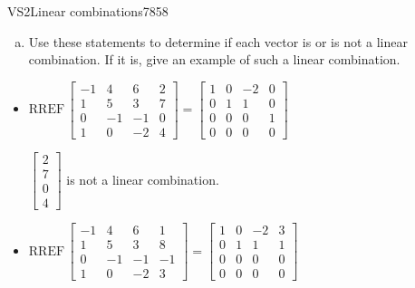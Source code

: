 \begin{exercise}{VS2}{Linear combinations}{7858}
\begin{exerciseStatement}
\begin{enumerate}[(a)]
\begin{itemize}
 
\end{itemize}

     
\item  

 Use these statements to determine if each vector is or is not a linear combination. If it is, give an example of such a linear combination. 

 
\end{enumerate}

     \end{exerciseStatement}
 \begin{exerciseAnswer} 

\begin{itemize}
\item  

 \(
\mathrm{RREF}\, \left[\begin{array}{ccc|c}
-1 & 4 & 6 & 2 \\
1 & 5 & 3 & 7 \\
0 & -1 & -1 & 0 \\
1 & 0 & -2 & 4
\end{array}\right] = \left[\begin{array}{ccc|c}
1 & 0 & -2 & 0 \\
0 & 1 & 1 & 0 \\
0 & 0 & 0 & 1 \\
0 & 0 & 0 & 0
\end{array}\right]
                        \) 

 

 \(\left[\begin{array}{c}
2 \\
7 \\
0 \\
4
\end{array}\right]\) is not a linear combination. 

 
\item  

 \(
\mathrm{RREF}\, \left[\begin{array}{ccc|c}
-1 & 4 & 6 & 1 \\
1 & 5 & 3 & 8 \\
0 & -1 & -1 & -1 \\
1 & 0 & -2 & 3
\end{array}\right] = \left[\begin{array}{ccc|c}
1 & 0 & -2 & 3 \\
0 & 1 & 1 & 1 \\
0 & 0 & 0 & 0 \\
0 & 0 & 0 & 0
\end{array}\right]
                        \) 


\end{itemize}
\end{exerciseAnswer}
\end{exercise}
